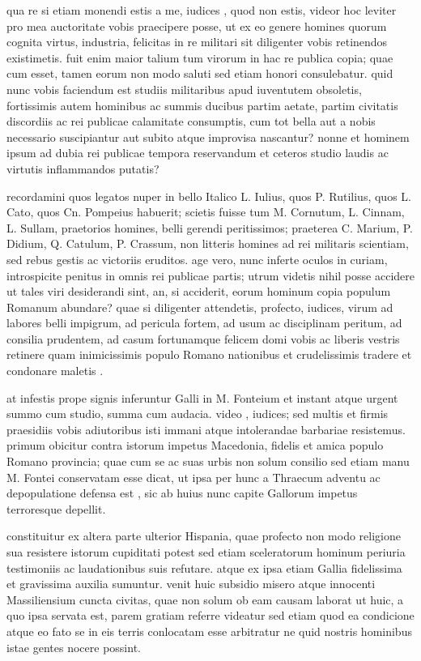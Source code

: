  qua re si etiam monendi estis a me, iudices , quod non estis, videor hoc leviter pro mea auctoritate vobis praecipere posse, ut ex eo genere homines quorum cognita virtus, industria, felicitas in re militari sit diligenter vobis retinendos existimetis. fuit enim maior talium tum virorum in hac re publica copia; quae cum esset, tamen eorum non modo saluti sed etiam honori consulebatur. quid nunc vobis faciendum est studiis militaribus apud iuventutem obsoletis, fortissimis autem hominibus ac summis ducibus partim aetate, partim civitatis discordiis ac rei publicae calamitate consumptis, cum tot bella aut a nobis necessario suscipiantur aut subito atque improvisa nascantur? nonne et hominem ipsum ad dubia rei publicae tempora reservandum et ceteros studio laudis ac virtutis inflammandos putatis?

 recordamini quos legatos nuper in bello Italico L. Iulius, quos P. Rutilius, quos L. Cato, quos Cn. Pompeius habuerit; scietis fuisse tum M. Cornutum, L. Cinnam, L. Sullam, praetorios homines, belli gerendi peritissimos; praeterea C. Marium, P. Didium, Q. Catulum, P. Crassum, non litteris homines ad rei militaris scientiam, sed rebus gestis ac victoriis eruditos. age vero, nunc inferte oculos in curiam, introspicite penitus in omnis rei publicae partis; utrum videtis nihil posse accidere ut tales viri desiderandi sint, an, si acciderit, eorum hominum copia populum Romanum abundare? quae si diligenter attendetis, profecto, iudices, virum ad labores belli impigrum, ad pericula fortem, ad usum ac disciplinam peritum, ad consilia prudentem, ad casum fortunamque felicem domi vobis ac liberis vestris retinere quam inimicissimis populo Romano nationibus et crudelissimis tradere et condonare maletis .

 at infestis prope signis inferuntur Galli in M. Fonteium et instant atque urgent summo cum studio, summa cum audacia. video , iudices; sed multis et firmis praesidiis vobis adiutoribus isti immani atque intolerandae barbariae resistemus. primum obicitur contra istorum impetus Macedonia, fidelis et amica populo Romano provincia; quae cum se ac suas urbis non solum consilio sed etiam manu M. Fontei conservatam esse dicat, ut ipsa per hunc a Thraecum adventu ac depopulatione defensa est , sic ab huius nunc capite Gallorum impetus terroresque depellit.

 constituitur ex altera parte ulterior Hispania, quae profecto non modo religione sua resistere istorum cupiditati potest sed etiam sceleratorum hominum periuria testimoniis ac laudationibus suis refutare. atque ex ipsa etiam Gallia fidelissima et gravissima auxilia sumuntur. venit huic subsidio misero atque innocenti Massiliensium cuncta civitas, quae non solum ob eam causam laborat ut huic, a quo ipsa servata est, parem gratiam referre videatur sed etiam quod ea condicione atque eo fato se in eis terris conlocatam esse arbitratur ne quid nostris hominibus istae gentes nocere possint.

